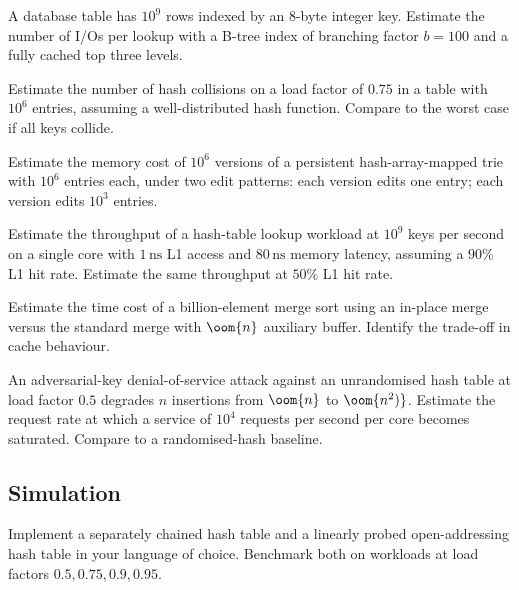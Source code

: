 \begin{exercise}
A database table has $10^9$ rows indexed by an 8-byte integer key. Estimate the number of I/Os per lookup with a B-tree index of branching factor $b = 100$ and a fully cached top three levels.
\end{exercise}

\begin{exercise}
Estimate the number of hash collisions on a load factor of $0.75$ in a table with $10^6$ entries, assuming a well-distributed hash function. Compare to the worst case if all keys collide.
\end{exercise}

\begin{exercise}
Estimate the memory cost of $10^6$ versions of a persistent hash-array-mapped trie with $10^6$ entries each, under two edit patterns: each version edits one entry; each version edits $10^3$ entries.
\end{exercise}

\begin{exercise}
Estimate the throughput of a hash-table lookup workload at $10^9$ keys per second on a single core with $1\,\si{\nano\second}$ L1 access and $80\,\si{\nano\second}$ memory latency, assuming a $90\%$ L1 hit rate. Estimate the same throughput at $50\%$ L1 hit rate.
\end{exercise}

\begin{exercise}
Estimate the time cost of a billion-element merge sort using an in-place merge versus the standard merge with $\oom{n}$ auxiliary buffer. Identify the trade-off in cache behaviour.
\end{exercise}

\begin{exercise}
An adversarial-key denial-of-service attack against an unrandomised hash table at load factor $0.5$ degrades $n$ insertions from $\oom{n}$ to $\oom{n^2)}$. Estimate the request rate at which a service of $10^4$ requests per second per core becomes saturated. Compare to a randomised-hash baseline.
\end{exercise}

\subsection*{Simulation}

\begin{exercise}
Implement a separately chained hash table and a linearly probed open-addressing hash table in your language of choice. Benchmark both on workloads at load factors $0.5, 0.75, 0.9, 0.95$.
\end{exercise}

